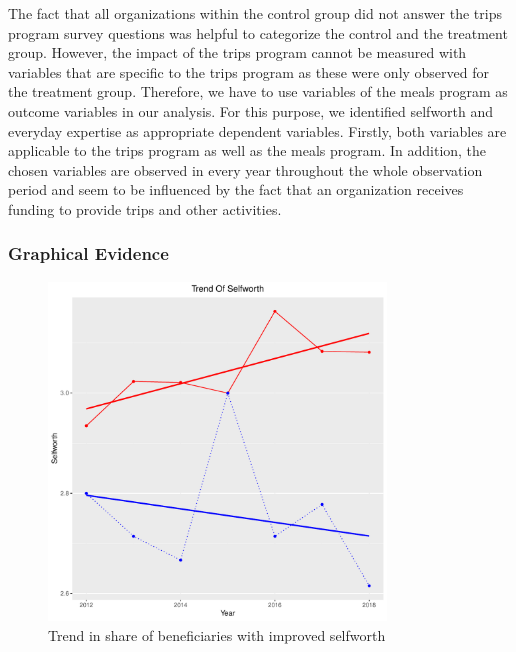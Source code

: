 \documentclass[12pt, a4paper, titlepage]{article}\usepackage[]{graphicx}\usepackage[]{color}
\newenvironment{knitrout}{}{} %
\begin{document}
The fact that all organizations within the control group did not answer the trips program survey questions was helpful to categorize the control and the treatment group. However, the impact of the trips program cannot be measured with variables that are specific to the trips program as these were only observed for the treatment group. Therefore, we have to use variables of the meals program as outcome variables in our analysis. For this purpose, we identified selfworth and everyday expertise as appropriate dependent variables. Firstly, both variables are applicable to the trips program as well as the meals program. In addition, the chosen variables are observed in every year throughout the whole observation period and seem to be influenced by the fact that an organization receives funding to provide trips and other activities.

\subsubsection{Graphical Evidence}

\begin{figure}
  \caption{Trend in share of beneficiaries with improved selfworth}
  \label{selfworth_Trend}

\begin{knitrout}
\color{fgcolor}

{\centering \includegraphics[width=0.8\textwidth]{figure/Selfworth-1} 

}



\end{knitrout}

\end{figure}
\end{document}
